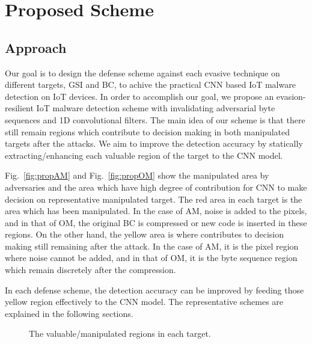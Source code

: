 \documentclass{ieeeaccess}
\newcommand{\myfigurename}{Fig.}
\begin{document}
\section{Proposed Scheme} \label{sec:proposed_scheme}
\subsection{Approach}
Our goal is to design the defense scheme against each evasive technique on different targets, GSI and BC, to achive the practical CNN based IoT malware detection on IoT devices.
In order to accomplish our goal, we propose an evasion-resilient IoT malware detection scheme with invalidating adversarial byte sequences and 1D convolutional filters.  
The main idea of our scheme is that there still remain regions which contribute to decision making in both manipulated targets after the attacks.
We aim to improve the detection accuracy by statically extracting/enhancing each valuable region of the target to the CNN model.

\myfigurename~\ref{fig:propAM} and \myfigurename~\ref{fig:propOM} show the manipulated area by adversaries and the area which have high degree of contribution for CNN to make decision on representative manipulated target.
The red area in each target is the area which has been manipulated.
In the case of AM, noise is added to the pixels, and in that of OM, the original BC is compressed or new code is inserted in these regions.
On the other hand, the yellow area is where contributes to decision making still remaining after the attack.
In the case of AM, it is the pixel region where noise cannot be added, and in that of OM, it is the byte sequence region which remain discretely after the compression.

In each defense scheme, the detection accuracy can be improved by feeding those yellow region effectively to the CNN model.
The representative schemes are explained in the following sections.

\begin{figure}[t]
 \centering
 \caption{The valuable/manipulated regions in each target.} 
 \label{fig:prop}
\end{figure}
\end{document}
